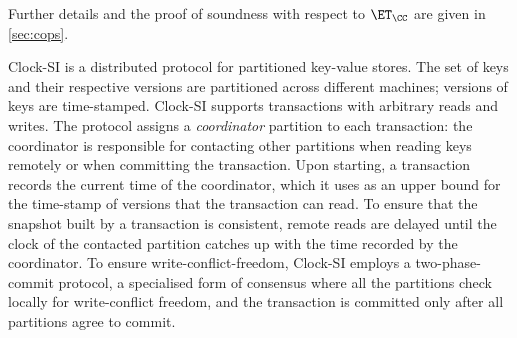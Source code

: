 Further details  and  the  proof of soundness with
respect to $\ET_\CC$  are given in \cref{sec:cops}.

Clock-SI is a distributed protocol for partitioned key-value
stores. The set of keys  and 
their respective versions are partitioned across different machines; versions of keys are time-stamped. 
Clock-SI supports transactions with arbitrary reads and writes. 
The protocol assigns a \emph{coordinator} partition to each transaction: the coordinator   
is responsible for contacting other partitions when reading keys remotely or 
when committing the transaction. Upon starting, a transaction records 
the current time of the coordinator, which it uses as an upper bound for the time-stamp 
of versions that the transaction can read. To ensure that the snapshot built by a transaction is consistent, 
remote reads are delayed until the clock of the contacted partition catches up with the time recorded by 
the coordinator. To ensure write-conflict-freedom, Clock-SI employs a two-phase-commit protocol, a specialised 
form of consensus where all the partitions check locally for write-conflict freedom, and the transaction 
is committed only after all partitions agree to commit.

